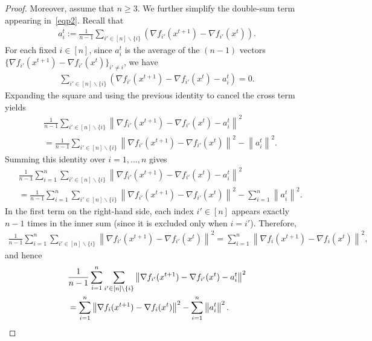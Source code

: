 \documentclass{article}
\newcommand{\sqn}[1]{\left\| #1 \right\|^2}
\newcommand{\eqdef}{:=}
\theoremstyle{plain}
\begin{document}
\begin{proof}
Moreover, assume that $n\geq 3$. We further simplify the double-sum term appearing in~\eqref{eqp2}.
Recall that
\begin{align*}
a_i^{t}\eqdef \frac{1}{n-1}\sum_{i'\in [n]\backslash\{i\}} \left(\nabla f_{i'}(x^{t+1})-\nabla f_{i'}(x^{t})\right).
\end{align*}
For each fixed $i\in[n]$, since $a_i^t$ is the average of the $(n-1)$ vectors
$\{\nabla f_{i'}(x^{t+1})-\nabla f_{i'}(x^{t})\}_{i'\neq i}$, we have
\begin{align*}
\sum_{i'\in [n]\backslash\{i\}}\left(\nabla f_{i'}(x^{t+1})-\nabla f_{i'}(x^{t})-a_i^t\right)=0.
\end{align*}
Expanding the square and using the previous identity to cancel the cross term yields
\begin{align*}
&\frac{1}{n-1}\sum_{i'\in [n]\backslash\{i\}} \sqn{\nabla f_{i'}(x^{t+1})-\nabla f_{i'}(x^{t})-a_i^t}\\
&=\frac{1}{n-1}\sum_{i'\in [n]\backslash\{i\}} \sqn{\nabla f_{i'}(x^{t+1})-\nabla f_{i'}(x^{t})}
-\sqn{a_i^t}.
\end{align*}
Summing this identity over $i=1,\ldots,n$ gives
\begin{align*}
&\frac{1}{n-1}\sum_{i=1}^n\sum_{i'\in [n]\backslash\{i\}}
\sqn{\nabla f_{i'}(x^{t+1})-\nabla f_{i'}(x^{t})-a_i^t}\\
&=\frac{1}{n-1}\sum_{i=1}^n\sum_{i'\in [n]\backslash\{i\}}
\sqn{\nabla f_{i'}(x^{t+1})-\nabla f_{i'}(x^{t})}
-\sum_{i=1}^n \sqn{a_i^t}.
\end{align*}
In the first term on the right-hand side, each index $i'\in[n]$ appears exactly $n-1$ times in the inner sum
(since it is excluded only when $i=i'$). Therefore,
\begin{align*}
\frac{1}{n-1}\sum_{i=1}^n\sum_{i'\in [n]\backslash\{i\}}
\sqn{\nabla f_{i'}(x^{t+1})-\nabla f_{i'}(x^{t})}
=\sum_{i=1}^n \sqn{\nabla f_{i}(x^{t+1})-\nabla f_{i}(x^{t})},
\end{align*}
and hence
\begin{align}
&\frac{1}{n-1}\sum_{i=1}^n\sum_{i'\in [n]\backslash\{i\}}
\sqn{\nabla f_{i'}(x^{t+1})-\nabla f_{i'}(x^{t})-a_i^t}\notag\\
&=\sum_{i=1}^n \sqn{\nabla f_{i}(x^{t+1})-\nabla f_{i}(x^{t})}
-\sum_{i=1}^n \sqn{a_i^t}.
\label{eq:prob_reduce_1}
\end{align}


\end{proof}
\end{document}
